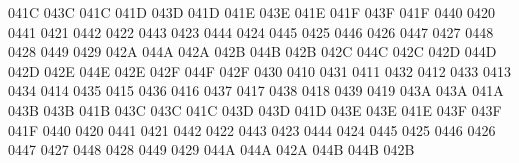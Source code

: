 \setcclcuc 041C 043C 041C %
\setcclcuc 041D 043D 041D %
\setcclcuc 041E 043E 041E %
\setcclcuc 041F 043F 041F %
 0440 0420 %
 0441 0421 %
 0442 0422 %
 0443 0423 %
 0444 0424 %
 0445 0425 %
 0446 0426 %
 0447 0427 %
 0448 0428 %
 0449 0429 %
\setcclcuc 042A 044A 042A %
\setcclcuc 042B 044B 042B %
\setcclcuc 042C 044C 042C %
\setcclcuc 042D 044D 042D %
\setcclcuc 042E 044E 042E %
\setcclcuc 042F 044F 042F %
 0430 0410 %
 0431 0411 %
 0432 0412 %
 0433 0413 %
 0434 0414 %
 0435 0415 %
 0436 0416 %
 0437 0417 %
 0438 0418 %
 0439 0419 %
\setcclcuc 043A 043A 041A %
\setcclcuc 043B 043B 041B %
\setcclcuc 043C 043C 041C %
\setcclcuc 043D 043D 041D %
\setcclcuc 043E 043E 041E %
\setcclcuc 043F 043F 041F %
 0440 0420 %
 0441 0421 %
 0442 0422 %
 0443 0423 %
 0444 0424 %
 0445 0425 %
 0446 0426 %
 0447 0427 %
 0448 0428 %
 0449 0429 %
\setcclcuc 044A 044A 042A %
\setcclcuc 044B 044B 042B %

